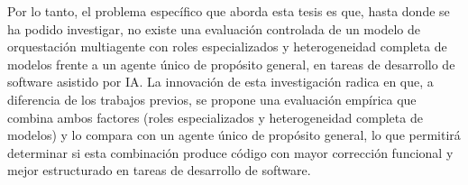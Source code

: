 
Por lo tanto, el problema específico que aborda esta tesis es que, hasta donde se ha podido investigar, no existe una evaluación controlada de un modelo de orquestación multiagente con roles especializados y heterogeneidad completa de modelos frente a un agente único de propósito general, en tareas de desarrollo de software asistido por IA. La innovación de esta investigación radica en que, a diferencia de los trabajos previos, se propone una evaluación empírica que combina ambos factores (roles especializados y heterogeneidad completa de modelos) y lo compara con un agente único de propósito general, lo que permitirá determinar si esta combinación produce código con mayor corrección funcional y mejor estructurado en tareas de desarrollo de software.

